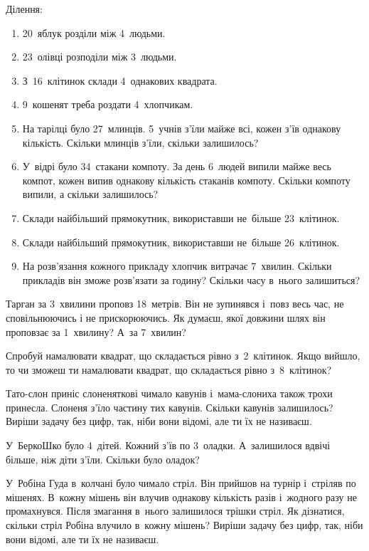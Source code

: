 \problem
Ділення:
\begin{enumerate}
  \item 20~яблук розділи між 4~людьми.
  \item 23~олівці розподіли між 3~людьми.
  \item З~16~клітинок склади 4~однакових квадрата.
  \item 9~кошенят треба роздати 4~хлопчикам.
  \item На тарілці було 27~млинців. 5~учнів з'їли майже всі,
  кожен з'їв однакову кількість.
  Скільки млинців з'їли, скільки залишилось?
  \item У~відрі було 34~стакани компоту.
  За день 6~людей випили майже весь компот,
  кожен випив однакову кількість стаканів компоту.
  Скільки компоту випили, а скільки залишилось?
  \item Склади найбільший прямокутник, використавши
  не~більше 23~клітинок.
  \item Склади найбільший прямокутник, використавши
  не~більше 26~клітинок.
  \item На розв'язання кожного прикладу хлопчик витрачає 7~хвилин.
  Скільки прикладів він зможе розв'язати за годину?
  Скільки часу в~нього залишиться?
\end{enumerate}


\problem
Тарган за 3~хвилини проповз 18~метрів.
Він не зупинявся і~повз весь час, не сповільнюючись і не прискорюючись.
Як думаєш, якої довжини шлях він проповзає за 1~хвилину?
А~за 7~хвилин?


\problem
Спробуй намалювати квадрат, що складається рівно з~2~клітинок.
Якщо вийшло, то чи зможеш ти намалювати квадрат,
що складається рівно з~8~клітинок?


\problem
{}
Тато-слон приніс слоненяткові чимало кавунів
і~мама-слониха також трохи принесла.
Слоненя з’їло частину тих кавунів.
Скільки кавунів залишилось?
Виріши задачу без цифр, так, ніби вони відомі, але ти їх не називаєш.


\problem
У~БеркоШко було 4~дітей. Кожний з’їв по 3~оладки.
А~залишилося вдвічі більше, ніж діти з’їли.
Скільки було оладок?


\problem
{}
У~Робіна Гуда в~колчані було чимало стріл.
Він прийшов на турнір і~стріляв по мішенях.
В~кожну мішень він влучив однакову кількість разів
і~жодного разу не промахнувся.
Після змагання в~нього залишилося трішки стріл.
Як дізнатися, скільки стріл Робіна влучило в~кожну мішень?
Виріши задачу без цифр, так, ніби вони відомі, але ти їх не називаєш.


